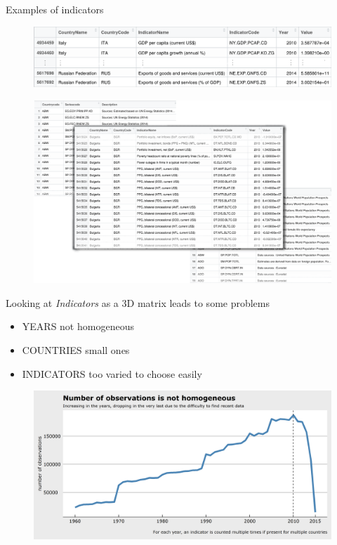 \documentclass[9pt]{beamer}
\begin{document}
\begin{frame}{Examples of indicators}
\begin{figure}
\centering
\includegraphics [width=\textwidth]{indicators.png}

\end{figure}
\end{frame}


\begin{frame}
\begin{figure}
\centering
\includegraphics[width=\textwidth]{tables_2.png}
\end{figure}
\end{frame}

\begin{frame}
Looking at \textit{Indicators} as a 3D matrix leads to some problems
\begin{itemize} [<+->]
\item YEARS  not homogeneous
\item COUNTRIES  small ones
\item INDICATORS  too varied to choose easily
\end{itemize}
\end{frame}

\begin{frame}
\begin{figure}
\centering
\includegraphics[width=\textwidth]{plot0001.png}
\end{figure}
\end{frame}
\end{document}
